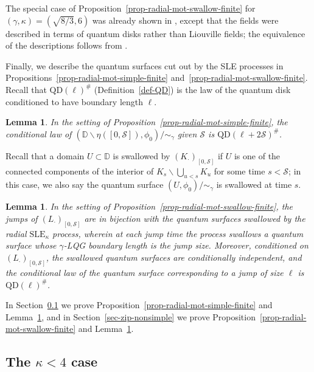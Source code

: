 \documentclass[a4paper]{article}
\numberwithin{equation}{section}
\newcommand{\D}{\mathbb{D}}
\newcommand{\qduration}{\mathcal{S}}
\newcommand{\QD}{\mathrm{QD}}
\newcommand{\SLE}{\mathrm{SLE}}
\newtheorem{lemma}[theorem]{Lemma}
\theoremstyle{remark}
\numberwithin{equation}{section}
\begin{document}
The special case of Proposition~\ref{prop-radial-mot-swallow-finite} for $(\gamma, \kappa) = (\sqrt{8/3}, 6)$ was already shown in 
\cite[Theorem 1.2]{ms-finite-mating}, except that the fields were described in terms of quantum disks rather than Liouville fields; the equivalence of the descriptions follows from \cite[Theorem 3.4]{ars-fzz}.


Finally, we describe the quantum surfaces cut out by the SLE processes in Propositions~\ref{prop-radial-mot-simple-finite} and~\ref{prop-radial-mot-swallow-finite}. Recall that $\QD(\ell)^\#$ (Definition~\ref{def-QD}) is the law of the quantum disk conditioned to have boundary length $\ell$.
\begin{lemma}\label{lem-simple-unexplored}
In the setting of Proposition~\ref{prop-radial-mot-simple-finite}, the conditional law of $(\D \backslash \eta([0,\qduration]), \phi_0)/{\sim_\gamma}$ given $\qduration$ is $\QD(\ell+2\qduration)^\#$.
\end{lemma}
Recall that a domain $U \subset \D$ is swallowed by $(K_\cdot)_{[0,\qduration]}$ if $U$ is one of the connected components of the interior of $K_s \backslash \bigcup_{u < s} K_u$ for some time $s < \qduration$; in this case, we also say the quantum surface $(U, \phi_0)/{\sim_\gamma}$ is swallowed at time $s$. 
\begin{lemma}\label{lem-swallowed-sle}
In the setting of Proposition~\ref{prop-radial-mot-swallow-finite}, the jumps of $(L_\cdot)_{[0,\qduration]}$ are in bijection with the quantum surfaces swallowed by the radial $\SLE_\kappa$ process, wherein at each jump time the process swallows a quantum surface whose $\gamma$-LQG boundary length is the jump size. 
Moreover, conditioned on $(L_{\cdot})_{[0,\qduration]}$, the swallowed quantum surfaces are conditionally independent, and the conditional law of the quantum surface corresponding to a jump of size $\ell$ is $\QD(\ell)^\#$.
\end{lemma}



In Section~\ref{sec-zip-simple} we prove Proposition~\ref{prop-radial-mot-simple-finite} and Lemma~\ref{lem-simple-unexplored}, and in Section~\ref{sec-zip-nonsimple} we prove Proposition~\ref{prop-radial-mot-swallow-finite} and Lemma~\ref{lem-swallowed-sle}.  

\subsection{The $\kappa < 4$ case}\label{sec-zip-simple}
\end{document}

